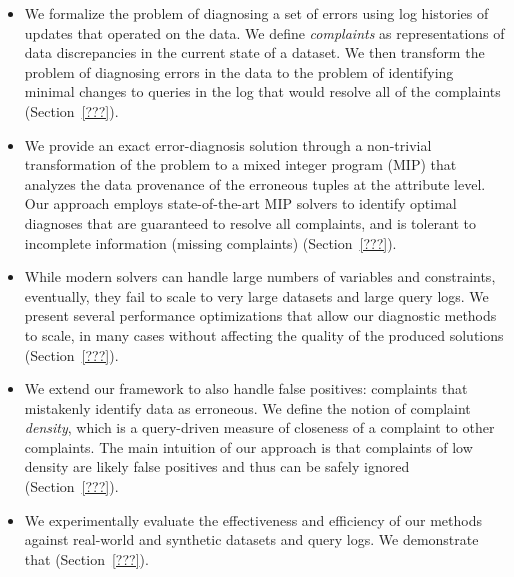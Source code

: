 \begin{itemize}[leftmargin=*, topsep=0mm, itemsep=0mm]      
    \item We formalize the problem of diagnosing a set of errors using log
    histories of updates that operated on the data. We define
    \emph{complaints} as representations of data discrepancies in the current
    state of a dataset. We then transform the problem of diagnosing errors in
    the data to the problem of identifying minimal changes to queries in the
    log that would resolve all of the complaints (Section~\ref{???}).
      
    \item We provide an exact error-diagnosis solution through a non-trivial
    transformation of the problem to a mixed integer program (MIP) that
    analyzes the data provenance of the erroneous tuples at the attribute
    level. Our approach employs state-of-the-art MIP solvers to identify
    optimal diagnoses that are guaranteed to resolve all complaints, and is
    tolerant to incomplete information (missing complaints)
    (Section~\ref{???}).
    
    \item While modern solvers can handle large numbers of variables and
    constraints, eventually, they fail to scale to very large datasets and
    large query logs. We present several performance optimizations that allow
    our diagnostic methods to scale, in many cases without affecting the
    quality of the produced solutions (Section~\ref{???}).
    
    \item We extend our framework to also handle false positives: complaints
    that mistakenly identify data as erroneous. We define the notion of
    complaint \emph{density}, which is a query-driven measure of closeness of
    a complaint to other complaints. The main intuition of our approach is
    that complaints of low density are likely false positives and thus can be
    safely ignored (Section~\ref{???}).
    
    \item We experimentally evaluate the effectiveness and efficiency of our
    methods against real-world and synthetic datasets and query logs. We
    demonstrate that 
    (Section~\ref{???}).
\end{itemize}



